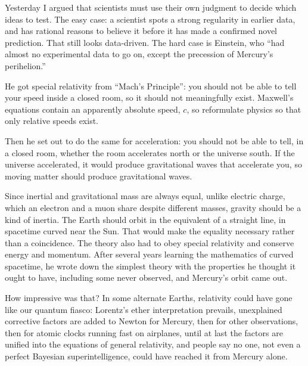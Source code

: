 
Yesterday I argued that scientists must use their own judgment to decide which ideas to test. The easy case: a scientist spots a strong regularity in earlier data, and has rational reasons to believe it before it has made a confirmed novel prediction. That still looks data-driven. The hard case is Einstein, who ``had almost no experimental data to go on, except the precession of Mercury's perihelion.''

He got special relativity from ``Mach's Principle'': you should not be able to tell your speed inside a closed room, so it should not meaningfully exist. Maxwell's equations contain an apparently absolute speed, $c$, so reformulate physics so that only relative speeds exist. 

Then he set out to do the same for acceleration: you should not be able to tell, in a closed room, whether the room accelerates north or the universe south. If the universe accelerated, it would produce gravitational waves that accelerate you, so moving matter should produce gravitational waves.

Since inertial and gravitational mass are always equal, unlike electric charge, which an electron and a muon share despite different masses, gravity should be a kind of inertia. The Earth should orbit in the equivalent of a straight line, in spacetime curved near the Sun. That would make the equality necessary rather than a coincidence.  The theory also had to obey special relativity and conserve energy and momentum. After several years learning the mathematics of curved spacetime, he wrote down the simplest theory with the properties he thought it ought to have, including some never observed, and Mercury's orbit came out. 

How impressive was that? In some alternate Earths, relativity could have gone like our quantum fiasco: Lorentz's ether interpretation prevails, unexplained corrective factors are added to Newton for Mercury, then for other observations, then for atomic clocks running fast on airplanes, until at last the factors are unified into the equations of general relativity, and people say no one, not even a perfect Bayesian superintelligence, could have reached it from Mercury alone.

